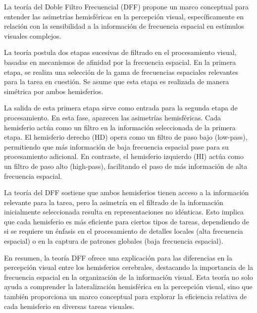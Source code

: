 \documentclass[12pt,oneside]{uhthesis}
\begin{document}
La teoría del Doble Filtro Frecuencial (DFF) propone un marco conceptual para entender las asimetrías hemisféricas en la percepción visual, específicamente en relación con la sensibilidad a la información de frecuencia espacial en estímulos visuales complejos.

La teoría postula dos etapas sucesivas de filtrado en el procesamiento visual, basadas en mecanismos de afinidad por la frecuencia espacial. En la primera etapa, se realiza una selección de la gama de frecuencias espaciales relevantes para la tarea en cuestión. Se asume que esta etapa es realizada de manera simétrica por ambos hemisferios.

La salida de esta primera etapa sirve como entrada para la segunda etapa de procesamiento. En esta fase, aparecen las asimetrías hemisféricas. Cada hemisferio actúa como un filtro en la información seleccionada de la primera etapa. El hemisferio derecho (HD) opera como un filtro de paso bajo (low-pass), permitiendo que más información de baja frecuencia espacial pase para su procesamiento adicional. En contraste, el hemisferio izquierdo (HI) actúa como un filtro de paso alto (high-pass), facilitando el paso de más información de alta frecuencia espacial.

La teoría del DFF sostiene que ambos hemisferios tienen acceso a la información relevante para la tarea, pero la asimetría en el filtrado de la información inicialmente seleccionada resulta en representaciones no idénticas. Esto implica que cada hemisferio es más eficiente para ciertos tipos de tareas, dependiendo de si se requiere un énfasis en el procesamiento de detalles locales (alta frecuencia espacial) o en la captura de patrones globales (baja frecuencia espacial).

En resumen, la teoría DFF ofrece una explicación para las diferencias en la percepción visual entre los hemisferios cerebrales, destacando la importancia de la frecuencia espacial en la organización de la información visual. Esta teoría no solo ayuda a comprender la lateralización hemisférica en la percepción visual, sino que también proporciona un marco conceptual para explorar la eficiencia relativa de cada hemisferio en diversas tareas visuales.





\backmatter




\end{document}
